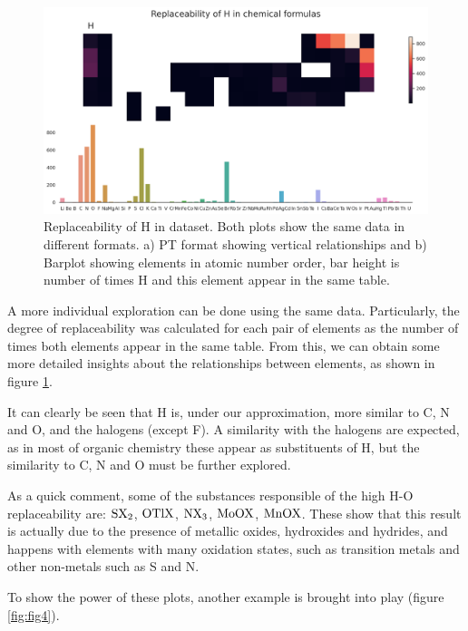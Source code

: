 \documentclass[]{article}
\begin{document}
\begin{figure}[h!]
  \centering
	\includegraphics[width=13.0cm]{replace_H.png}
	\caption{Replaceability of H in dataset. Both plots show the same data in different formats. a) PT format showing vertical relationships and b) Barplot showing elements in atomic number order, bar height is number of times H and this element appear in the same table.}
	\label{fig:fig3}
\end{figure}

A more individual exploration can be done using the same data. Particularly, the degree of replaceability was calculated for each pair of elements as the number of times both elements appear in the same table. From this, we can obtain some more detailed insights about the relationships between elements, as shown in figure \ref{fig:fig3}.

It can clearly be seen that H is, under our approximation, more similar to C, N and O, and the halogens (except F). A similarity with the halogens are expected, as in most of organic chemistry these appear as substituents of H, but the similarity to C, N and O must be further explored.

As a quick comment, some of the substances responsible of the high H-O replaceability are: 
$\ce{SX2}$, $\ce{OTlX}$, $\ce{NX3}$, $\ce{MoOX}$, $\ce{MnOX}$. These show that this result is actually due to the presence of metallic oxides, hydroxides and hydrides, and happens with elements with many oxidation states, such as transition metals and other non-metals such as S and N.

To show the power of these plots, another example is brought into play (figure \ref{fig:fig4}).
\end{document}
